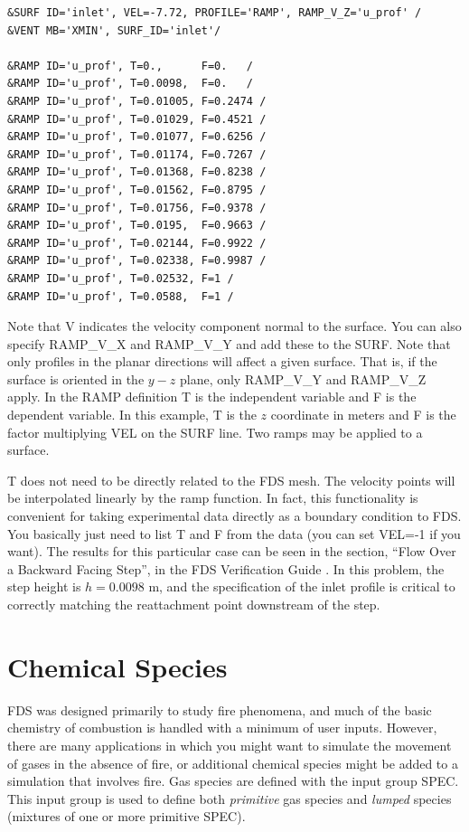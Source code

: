 \documentclass[11pt]{book}
\begin{document}
\begin{lstlisting}
&SURF ID='inlet', VEL=-7.72, PROFILE='RAMP', RAMP_V_Z='u_prof' /
&VENT MB='XMIN', SURF_ID='inlet'/

&RAMP ID='u_prof', T=0.,      F=0.   /
&RAMP ID='u_prof', T=0.0098,  F=0.   /
&RAMP ID='u_prof', T=0.01005, F=0.2474 /
&RAMP ID='u_prof', T=0.01029, F=0.4521 /
&RAMP ID='u_prof', T=0.01077, F=0.6256 /
&RAMP ID='u_prof', T=0.01174, F=0.7267 /
&RAMP ID='u_prof', T=0.01368, F=0.8238 /
&RAMP ID='u_prof', T=0.01562, F=0.8795 /
&RAMP ID='u_prof', T=0.01756, F=0.9378 /
&RAMP ID='u_prof', T=0.0195,  F=0.9663 /
&RAMP ID='u_prof', T=0.02144, F=0.9922 /
&RAMP ID='u_prof', T=0.02338, F=0.9987 /
&RAMP ID='u_prof', T=0.02532, F=1 /
&RAMP ID='u_prof', T=0.0588,  F=1 /
\end{lstlisting}

Note that {\ct V} indicates the velocity component normal to the surface.  You can also specify {\ct RAMP\_V\_X} and {\ct RAMP\_V\_Y} and add these to the {\ct SURF}.  Note that only profiles in the planar directions will affect a given surface.  That is, if the surface is oriented in the $y-z$ plane, only {\ct RAMP\_V\_Y} and {\ct RAMP\_V\_Z} apply.  In the {\ct RAMP} definition {\ct T} is the independent variable and {\ct F} is the dependent variable.  In this example, {\ct T} is the $z$ coordinate in meters and {\ct F} is the factor multiplying {\ct VEL} on the {\ct SURF} line.  Two ramps may be applied to a surface.

{\ct T} does not need to be directly related to the FDS mesh.  The velocity points will be interpolated linearly by the ramp function.  In fact, this functionality is convenient for taking experimental data directly as a boundary condition to FDS.  You basically just need to list {\ct T} and {\ct F} from the data (you can set {\ct VEL=-1} if you want).  The results for this particular case can be seen in the section, ``Flow Over a Backward Facing Step'', in the FDS Verification Guide \cite{FDS_Verification_Guide}. In this problem, the step height is $h=0.0098$ m, and the specification of the inlet profile is critical to correctly matching the reattachment point downstream of the step.


\chapter{Chemical Species}
\label{info:SPEC}

FDS was designed primarily to study fire phenomena, and much of the basic chemistry of combustion is handled with a minimum of user inputs. However, there are many applications in which you might want to simulate the movement of gases in the absence of fire, or additional chemical species might be added to a simulation that involves fire.  Gas species are defined with the input group
{\ct SPEC}.  This input group is used to define both {\em primitive} gas species and {\em lumped} species (mixtures of one or more primitive {\ct SPEC}).
\end{document}
